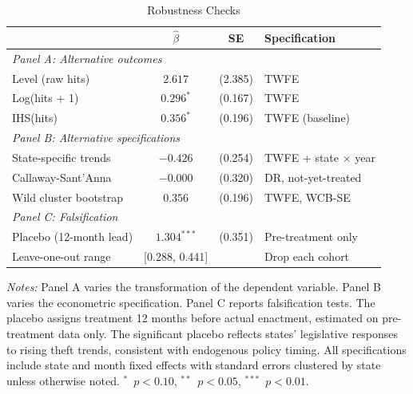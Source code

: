 \begin{table}[htbp]
\centering
\caption{Robustness Checks}
\label{tab:robust}
\begin{tabular}{lccl}
\hline\hline
 & $\hat{\beta}$ & SE & Specification \\
\hline
\multicolumn{4}{l}{\textit{Panel A: Alternative outcomes}} \\
Level (raw hits) & $2.617$ & (2.385) & TWFE \\
Log(hits + 1) & $0.296^{*}$ & (0.167) & TWFE \\
IHS(hits) & $0.356^{*}$ & (0.196) & TWFE (baseline) \\
[0.5em]
\multicolumn{4}{l}{\textit{Panel B: Alternative specifications}} \\
State-specific trends & $-0.426$ & (0.254) & TWFE + state $\times$ year \\
Callaway-Sant'Anna & $-0.000$ & (0.320) & DR, not-yet-treated \\
Wild cluster bootstrap & $0.356$ & (0.196) & TWFE, WCB-SE \\
[0.5em]
\multicolumn{4}{l}{\textit{Panel C: Falsification}} \\
Placebo (12-month lead) & $1.304^{***}$ & (0.351) & Pre-treatment only \\
Leave-one-out range & [0.288, 0.441] & & Drop each cohort \\
\hline\hline
\end{tabular}
\begin{tablenotes}[flushleft]
\small
\item \textit{Notes:} Panel A varies the transformation of the dependent variable. Panel B varies the econometric specification. Panel C reports falsification tests. The placebo assigns treatment 12 months before actual enactment, estimated on pre-treatment data only. The significant placebo reflects states' legislative responses to rising theft trends, consistent with endogenous policy timing. All specifications include state and month fixed effects with standard errors clustered by state unless otherwise noted. $^{*}$~$p<0.10$, $^{**}$~$p<0.05$, $^{***}$~$p<0.01$.
\end{tablenotes}
\end{table}

